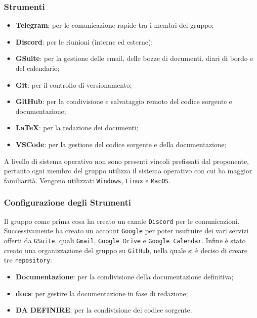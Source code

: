         \subsubsection{Strumenti}
            \begin{itemize}
                \item \textbf{Telegram}: per le comunicazione rapide tra i membri del gruppo;
                \item \textbf{Discord}: per le riunioni (interne ed esterne);
                \item \textbf{GSuite}: per la gestione delle email, delle bozze di documenti, diari di bordo e del calendario;
                \item \textbf{Git}: per il controllo di versionamento;
                \item \textbf{GitHub}: per la condivisione e salvataggio remoto del codice sorgente e documentazione;
                \item \textbf{LaTeX}: per la redazione dei documenti;
                \item \textbf{VSCode}: per la gestione del codice sorgente e della documentazione;
            \end{itemize}
            
            A livello di sistema operativo non sono presenti vincoli prefissati dal proponente, pertanto ogni membro del gruppo utilizza il sistema operativo con cui ha maggior familiarità.
            Vengono utilizzati \texttt{Windows}, \texttt{Linux} e \texttt{MacOS}.

        \subsubsection{Configurazione degli Strumenti}
            Il gruppo come prima cosa ha creato un canale \texttt{Discord} per le comunicazioni.
            Successivamente ha creato un account \texttt{Google} per poter usufruire dei vari servizi offerti da \texttt{GSuite}, quali \texttt{Gmail}, \texttt{Google Drive} e \texttt{Google Calendar}.
            Infine è stato creato una organizzazione del gruppo su \texttt{GitHub}, nella quale si è deciso di creare tre \texttt{repository}:
                \begin{itemize}
                    \item \textbf{Documentazione}: per la condivisione della documentazione definitiva;
                    \item \textbf{docs}: per gestire la documentazione in fase di redazione;
                    \item \textbf{DA DEFINIRE}: per la condivisione del codice sorgente.
                \end{itemize}

